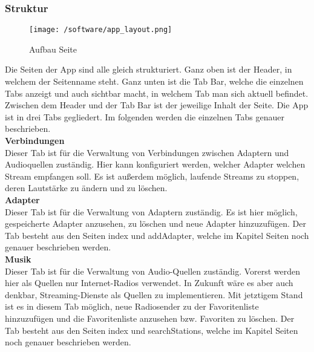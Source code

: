 \documentclass[]{article}
\begin{document}
\subsubsection{Struktur}
\begin{figure}[H]
\texttt{[image: /software/app\_layout.png]}
\caption{Aufbau Seite}
\end{figure}
Die Seiten der App sind alle gleich strukturiert. Ganz oben ist der Header, in welchem der Seitenname steht. Ganz unten ist die Tab Bar, welche die einzelnen Tabs anzeigt und auch sichtbar macht, in welchem Tab man sich aktuell befindet. Zwischen dem Header und der Tab Bar ist der jeweilige Inhalt der Seite.
Die App ist in drei Tabs gegliedert. Im folgenden werden die einzelnen Tabs genauer beschrieben. \newline \\
\textbf{Verbindungen} \\
Dieser Tab ist für die Verwaltung von Verbindungen zwischen Adaptern und Audioquellen zuständig. Hier kann konfiguriert werden, welcher Adapter welchen Stream empfangen soll. Es ist außerdem möglich, laufende Streams zu stoppen, deren Lautstärke zu ändern und zu löschen. \newline \\
\textbf{Adapter} \\
Dieser Tab ist für die Verwaltung von Adaptern zuständig. Es ist hier möglich, gespeicherte Adapter anzusehen, zu löschen und neue Adapter hinzuzufügen. Der Tab besteht aus den Seiten index und addAdapter, welche im Kapitel Seiten noch genauer beschrieben werden.  \newline \\
\textbf{Musik} \\
Dieser Tab ist für die Verwaltung von Audio-Quellen zuständig. Vorerst werden hier als Quellen nur Internet-Radios verwendet. In Zukunft wäre es aber auch denkbar, Streaming-Dienste als Quellen zu implementieren. Mit jetztigem Stand ist es in diesem Tab möglich, neue Radiosender zu der Favoritenliste hinzuzufügen und die Favoritenliste anzusehen bzw. Favoriten zu löschen. Der Tab besteht aus den Seiten index und searchStations, welche im Kapitel Seiten noch genauer beschrieben werden. \newline \\
\end{document}
